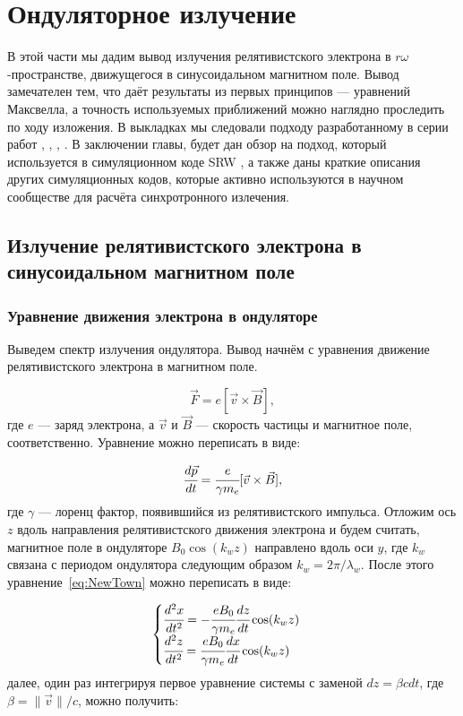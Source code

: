 \chapter{Ондуляторное излучение}
В этой части мы дадим вывод излучения релятивистского электрона в $r\omega$-пространстве, движущегося в синусоидальном магнитном поле. Вывод замечателен тем, что даёт результаты из первых принципов --- уравнений Максвелла, а точность используемых приближений можно наглядно проследить по ходу изложения. В выкладках мы следовали подходу разработанному в серии работ \cite{geloni2005paraxial}, \cite{geloni2007fourier}, \cite{geloni2015brightness }, \cite{geloni2006fourier}. В заключении главы, будет дан обзор на подход, который используется в симуляционном коде SRW \cite{chubar1998proceedings}, а также даны краткие описания других симуляционных кодов, которые активно используются в научном сообществе для расчёта синхротронного излечения. 
\section{Излучение релятивистского электрона в синусоидальном магнитном поле}
\subsection{Уравнение движения электрона в ондуляторе}
Выведем спектр излучения ондулятора. Вывод начнём с уравнения движение релятивистского электрона в магнитном поле.

\begin{equation}
	\vec{F} = e[\vec{v} \times \vec{B}],
\end{equation} 
где $e$ --- заряд электрона, а $\vec{v}$ и $\vec{B}$ --- скорость частицы и магнитное поле, соответственно. Уравнение можно переписать в виде:

\begin{equation}
	\label{eq:NewTown}
	\cfrac{d\vec{p}}{dt} = \cfrac{e}{\gamma m_e}[\vec{v} \times \vec{B}],
\end{equation}
где $\gamma$ --- лоренц фактор, появившийся из релятивистского импульса. Отложим ось $z$ вдоль направления релятивистского движения электрона и будем считать, магнитное поле в ондуляторе $B_0\cos(k_w z)$ направлено вдоль оси $y$, где $k_w$ связана с периодом ондулятора следующим образом $k_w = 2\pi/\lambda_w$. После этого уравнение~\ref{eq:NewTown} можно переписать в виде:

\begin{equation}
	\label{eq:eq_of_motion}
	\begin{cases}
		\cfrac{d^2 x}{dt^2} = - \cfrac{e B_0}{\gamma m_e}\cfrac{dz}{dt} \cos(k_w z)\\
		\cfrac{d^2 z}{dt^2} = \cfrac{e B_0}{\gamma m_e}\cfrac{dx}{dt} \cos(k_w z)
	\end{cases} 
\end{equation}
далее, один раз интегрируя первое уравнение системы с заменой $dz = \beta cdt$, где $\beta = \|\vec{v}\| /c$, можно получить: 


